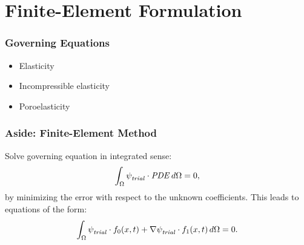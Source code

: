 \documentclass[aspectratio=169]{beamer}
\begin{document}
\section{Finite-Element Formulation}

\abovedisplayskip=2pt
\abovedisplayshortskip=2pt
\belowdisplayskip=2pt
\belowdisplayshortskip=2pt

\begin{frame}
  \frametitle{Governing Equations}
  \summary{}

  \begin{itemize}
  \item Elasticity
  \item Incompressible elasticity
  \item Poroelasticity
  \end{itemize}

  \vfill
  
  
\end{frame}

\begin{frame}
  \frametitle{Aside: Finite-Element Method}

  Solve governing equation in integrated sense:
  \begin{equation}
    \int_\Omega {\psi_\mathit{trial}^{}} \cdot \mathit{PDE} \, d\Omega = 0,
  \end{equation}
  by minimizing the error with respect to the unknown coefficients.
  \vfill
  This leads to equations of the form:
  \begin{equation}
    \int_\Omega {\psi_\mathit{trial}^{}} \cdot f_0(x,t) + \nabla {\psi_\mathit{trial}^{}} \cdot f_1(x,t) \, d\Omega = 0.
  \end{equation}

\end{frame}
\end{document}
